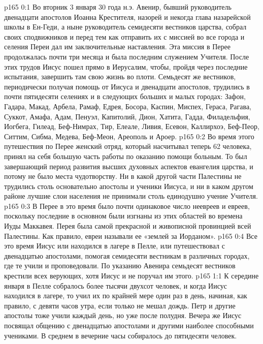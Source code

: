 \author{Комиссия срединников}
\vs p165 0:1 Во вторник 3 января 30 года н.э. Авенир, бывший руководитель двенадцати апостолов Иоанна Крестителя, назорей и некогда глава назарейской школы в Ен\hyp{}Геди, а ныне руководитель семидесяти вестников царства, собрал своих сподвижников и перед тем как отправить их с миссией во все города и селения Переи дал им заключительные наставления. Эта миссия в Перее продолжалась почти три месяца и была последним служением Учителя. После этих трудов Иисус пошел прямо в Иерусалим, чтобы, пройдя через последние испытания, завершить там свою жизнь во плоти. Семьдесят же вестников, периодически получая помощь от Иисуса и двенадцати апостолов, трудились в почти пятидесяти селениях и в следующих больших и малых городах: Зафон, Гадара, Макад, Арбела, Рамаф, Едрея, Босора, Каспин, Миспех, Гераса, Рагава, Суккот, Амафа, Адам, Пенуэл, Капитолий, Дион, Хатита, Гадда, Филадельфия, Иогбега, Гилеад, Беф\hyp{}Нимрах, Тир, Елеале, Ливия, Есевон, Каллирхоэ, Беф\hyp{}Пеор, Ситтим, Сибма, Медева, Беф\hyp{}Меон, Ареополь и Ароер.
\vs p165 0:2 Во время этого путешествия по Перее женский отряд, который насчитывал теперь 62 человека, принял на себя большую часть работы по оказанию помощи больным. То был завершающий период развития высших духовных аспектов евангелия царства, и потому не было места чудотворству. Ни в какой другой части Палестины не трудились столь основательно апостолы и ученики Иисуса, и ни в каком другом районе лучшие слои населения не принимали столь единодушно учение Учителя.
\vs p165 0:3 В Перее в это время было почти одинаковое число неевреев и евреев, поскольку последние в основном были изгнаны из этих областей во времена Иуды Маккавея. Перея была самой прекрасной и живописной провинцией всей Палестины. Как правило, евреи называли ее «землей за Иорданом».
\vs p165 0:4 Все это время Иисус или находился в лагере в Пелле, или путешествовал с двенадцатью апостолами, помогая семидесяти вестникам в различных городах, где те учили и проповедовали. По указанию Авенира семьдесят вестников крестили всех верующих, хотя Иисус и не поручал им этого.
\vs p165 1:1 К середине января в Пелле собралось более тысячи двухсот человек, и когда Иисус находился в лагере, то учил их по крайней мере один раз в день, начиная, как правило, с девяти часов утра, если только не мешал дождь. Петр и другие апостолы тоже учили каждый день, но уже после полудня. Вечера же Иисус посвящал общению с двенадцатью апостолами и другими наиболее способными учениками. В среднем в вечерние часы собиралось до пятидесяти человек.
